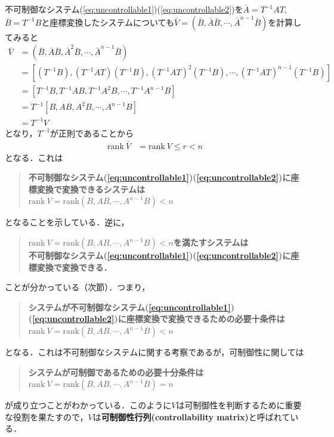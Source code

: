不可制御なシステム(\ref{eq:uncontrollable1})(\ref{eq:uncontrollable2})を$\bar{A}= T^{-1} A T$, $\bar{B} = T^{-1}B$と座標変換したシステムについても$\bar{V}=(\bar{B},\bar{A}\bar{B},\cdots, \bar{A}^{n-1}\bar{B})$を計算してみると
\begin{align}
 \bar{V}&=(\bar{B},\bar{A}\bar{B},\bar{A}^{2}\bar{B},\cdots, \bar{A}^{n-1}\bar{B})
\nonumber\\
 &= [(T^{-1}B), (T^{-1}AT)(T^{-1}B),(T^{-1}AT)^{2}(T^{-1}B),\cdots,(T^{-1}AT)^{n-1}(T^{-1}B)]
\nonumber \\
 &= [T^{-1}B, T^{-1} AB, T^{-1} A^2 B,\cdots, T^{-1} A^{n-1} B]
\nonumber\\
 &= T^{-1} [B, AB, A^2 B,\cdots, A^{n-1} B]
\nonumber \\
 &= T^{-1} V
\end{align}
となり，$T^{-1}$が正則であることから
\begin{align}
 \mbox{rank}\ \bar{V} & = \mbox{rank}\ {V} \leq r < n
\end{align}
となる．これは
\begin{quote}
{\bf 不可制御なシステム(\ref{eq:uncontrollable1})(\ref{eq:uncontrollable2})に座標変換で変換できるシステムは\\
$\mbox{rank}\ V = \mbox{rank} (B,AB,\cdots,A^{n-1}B) < n$}
\end{quote}
となることを示している．逆に，
\begin{quote}
{\bf $\mbox{rank}\ V = \mbox{rank} (B,AB,\cdots,A^{n-1}B) < n$を満たすシステムは\\
不可制御なシステム(\ref{eq:uncontrollable1})(\ref{eq:uncontrollable2})に座標変換で変換できる．}
\end{quote}
ことが分かっている（次節）．つまり，
\begin{quote}
{\bf システムが不可制御なシステム(\ref{eq:uncontrollable1})(\ref{eq:uncontrollable2})に座標変換で変換できるための必要十条件は
$\mbox{rank}\ V = \mbox{rank} (B,AB,\cdots,A^{n-1}B) < n$}
\end{quote}
となる．これは不可制御なシステムに関する考察であるが，可制御性に関しては
\begin{quote}
{\bf システムが可制御であるための必要十分条件は\\
$\mbox{rank}\ V = \mbox{rank} (B,AB,\cdots,A^{n-1}B) = n$}
\end{quote}
が成り立つことがわかっている．このように$V$は可制御性を判断するために重要な役割を果たすので，$V$は{\bf 可制御性行列(controllability matrix)}と呼ばれている．
\\




